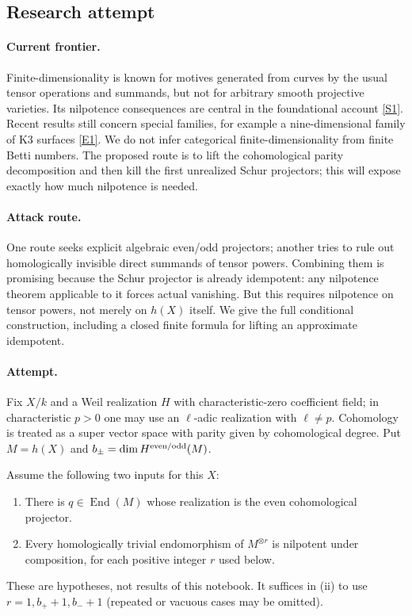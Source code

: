 \documentclass[11pt,a4paper]{article}
\newcommand{\sref}[2]{\hyperlink{source:#1:#2}{[S#2]}}
\newcommand{\eref}[2]{\hyperlink{extra:#1:#2}{[E#2]}}
\numberwithin{equation}{section}
\begin{document}
\subsection{Research attempt}

\paragraph{Current frontier.}
Finite-dimensionality is known for motives generated from curves by the usual tensor operations and summands, but not for arbitrary smooth projective varieties. Its nilpotence consequences are central in the foundational account \sref{30006782}{1}. Recent results still concern special families, for example a nine-dimensional family of K3 surfaces \eref{30006782}{1}. We do not infer categorical finite-dimensionality from finite Betti numbers. The proposed route is to lift the cohomological parity decomposition and then kill the first unrealized Schur projectors; this will expose exactly how much nilpotence is needed.

\paragraph{Attack route.}
One route seeks explicit algebraic even/odd projectors; another tries to rule out homologically invisible direct summands of tensor powers. Combining them is promising because the Schur projector is already idempotent: any nilpotence theorem applicable to it forces actual vanishing. But this requires nilpotence on tensor powers, not merely on $h(X)$ itself. We give the full conditional construction, including a closed finite formula for lifting an approximate idempotent.

\paragraph{Attempt.}
Fix $X/k$ and a Weil realization $H$ with characteristic-zero coefficient field; in characteristic $p>0$ one may use an $\ell$-adic realization with $\ell\ne p$. Cohomology is treated as a super vector space with parity given by cohomological degree. Put $M=h(X)$ and $b_\pm=\dim H^{\rm even/odd}(M)$.

Assume the following two inputs for this $X$:
\begin{enumerate}[label=(\roman*),leftmargin=2.5em]
\item There is $q\in\operatorname{End}(M)$ whose realization is the even cohomological projector.
\item Every homologically trivial endomorphism of $M^{\otimes r}$ is nilpotent under composition, for each positive integer $r$ used below.
\end{enumerate}
These are hypotheses, not results of this notebook. It suffices in (ii) to use $r=1,b_++1,b_-+1$ (repeated or vacuous cases may be omitted).
\end{document}
